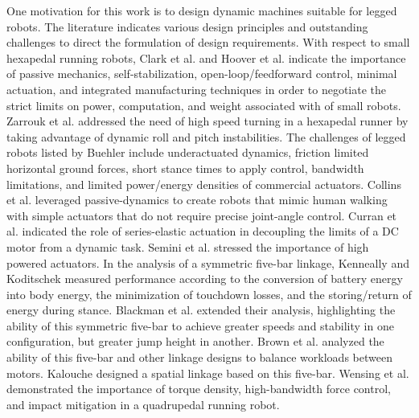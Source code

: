 \documentclass[journal]{IEEEtran}
\begin{document}
One motivation for this work is to design dynamic machines suitable for legged robots.
The literature indicates various design principles and outstanding challenges to direct the formulation of design requirements.
With respect to small hexapedal running robots, Clark et al. \cite{clarkBiomimeticDesignFabrication2001} and Hoover et al. \cite{hooverBioinspiredDesignDynamic2010} indicate the importance of passive mechanics, self-stabilization, open-loop/feedforward control, minimal actuation, and integrated manufacturing techniques in order to negotiate the strict limits on power, computation, and weight associated with of small robots.
Zarrouk et al. \cite{zarroukDynamicLeggedLocomotion2015} addressed the need of high speed turning in a hexapedal runner by taking advantage of dynamic roll and pitch instabilities.
The challenges of legged robots listed by Buehler \cite{buehlerDynamicLocomotionOne2002} include underactuated dynamics, friction limited horizontal ground forces, short stance times to apply control, bandwidth limitations, and limited power/energy densities of commercial actuators.
Collins et al. \cite{collinsEfficientBipedalRobots2005} leveraged passive-dynamics to create robots that mimic human walking with simple actuators that do not require precise joint-angle control.
Curran et al. \cite{curranDesignSeriesElasticActuators2008} indicated the role of series-elastic actuation in decoupling the limits of a DC motor from a dynamic task.
Semini et al. \cite{seminiDesignHyQHydraulically2011} stressed the importance of high powered actuators.
In the analysis of a symmetric five-bar linkage, Kenneally and Koditschek \cite{kenneallyLegDesignEnergy2015} measured performance according to the conversion of battery energy into body energy, the minimization of touchdown losses, and the storing/return of energy during stance.
Blackman et al. \cite{blackmanLegDesignRunning2017} extended their analysis, highlighting the ability of this symmetric five-bar to achieve greater speeds and stability in one configuration, but greater jump height in another.
Brown et al. \cite{brownDesignMethodologyLinkage2017} analyzed the ability of this five-bar and other linkage designs to balance workloads between motors.
Kalouche \cite{kaloucheGOATLeggedRobot2017} designed a spatial linkage based on this five-bar.
Wensing et al. \cite{wensingProprioceptiveActuatorDesign2017} demonstrated the importance of torque density, high-bandwidth force control, and impact mitigation in a quadrupedal running robot.
\end{document}
